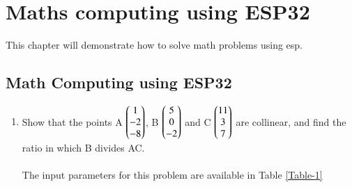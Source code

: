 \chapter{Maths computing using ESP32}
This chapter will demonstrate how to solve math problems using esp.
\section{Math Computing using ESP32}

\begin{enumerate}[label=\thesection.\arabic*.,ref=\thesection.\theenumi]

	\item Show that the points A $\begin{pmatrix}1\\-2\\-8\end{pmatrix}$, B $\begin{pmatrix}5\\0\\-2\end{pmatrix}$ and C $\begin{pmatrix}11\\3\\7\end{pmatrix}$ are collinear, and find the ratio in which B divides AC.\\


\solution \\The input parameters for this problem are available in Table \ref{Table-1}
\begin{table}[ht!]

\caption{}
\label{Table-1}	

\end{table}


\end{enumerate}
